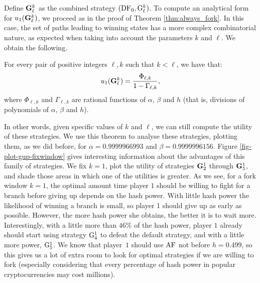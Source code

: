 Define ${\rm {\bf G}}_\ell^k$ as the combined strategy $(\text{\rm DF}_0, {\rm {G}}_\ell^k)$. 
To compute an analytical form for $u_1({\rm {\bf G}}_\ell^k)$, we proceed as in the proof of Theorem \ref{thm:always_fork}. In this case, the set of paths leading to winning states has a more complex combinatorial nature, as expected when taking into account the 
parameters $k$ and $\ell$. We obtain the following.
\begin{theorem}
For every pair of positive integers $\ell, k$ such that $k< \ell$, we have that:
$$u_1({\rm {\bf G}}^k_\ell) = \frac{\Phi_{\ell,k}}{1-\Gamma_{\ell,k}},$$
where $\Phi_{\ell,k}$ and $\Gamma_{\ell,k}$ are rational functions of $\alpha$, $\beta$ and $h$ (that is, divisions of polynomials of  $\alpha$, $\beta$ and $h$).
\end{theorem}
In other words, given specific values of $k$ and $\ell$, we can still compute the utility of these strategies. We use this theorem to analyse these strategies, plotting them, as we did before, 
for $\alpha = 0.9999966993$ and $\beta = 0.9999996156$. Figure \ref{fig-plot-gup-fixwindow} gives 
interesting 
information about the advantages of this family of strategies. 
We fix $k = 1$, plot the utility of strategies ${\rm {\bf G}}^1_2$ through ${\rm {\bf G}}^1_5$, and shade those areas in which one of the utilities is greater. As we see, for a 
fork window $k = 1$, the optimal amount time player $1$ should be willing to fight for a branch before giving up depends on the hash power. With little hash power the likelihood of winning a 
branch is small, so player 1 should give up as early as possible. However, the more hash power she obtains, the better it is to wait more. Interestingly, with a little more than 
$46\%$ of the hash power, player $1$ already should start using strategy ${\rm {G}}^1_4$ to defeat the default strategy, and with a little more power, ${\rm {G}}^1_5$. We know that player~$1$ should use $\text{\rm AF}$ not before 
$h = 0.499$, so this gives us a lot of extra room to look for optimal strategies if we are willing to fork (especially considering that every percentage of hash power in popular cryptocurrencies 
may cost millions).

